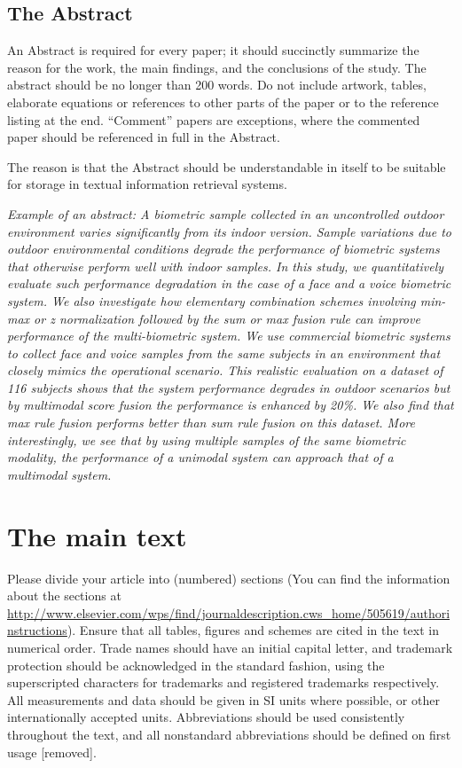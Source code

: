 \documentclass[times,twocolumn,final]{elsarticle}
\begin{document}
\subsection{The Abstract}
An Abstract is required for every paper; it should succinctly summarize
the reason for the work, the main findings, and the conclusions of the
study. The abstract should be no longer than 200 words. Do not include
artwork, tables, elaborate equations or references to other parts of
the paper or to the reference listing at the end. ``Comment'' papers
are exceptions, where the commented paper should be referenced in full
in the Abstract.

The reason is that the Abstract should be understandable in itself to
be suitable for storage in textual information retrieval systems.

\textit{Example of an abstract: A biometric sample collected in an
uncontrolled outdoor environment varies significantly from its
indoor version. Sample variations due to outdoor environmental
conditions degrade the performance of biometric systems that
otherwise perform well with indoor samples. In this study, we
quantitatively evaluate such performance degradation in the case
of a face and a voice biometric system. We also investigate how
elementary combination schemes involving min-max or z
normalization followed by the sum or max fusion rule can
improve performance of the multi-biometric system. We use
commercial biometric systems to collect face and voice samples
from the same subjects in an environment that closely mimics the
operational scenario. This realistic evaluation on a dataset of
116 subjects shows that the system performance degrades in
outdoor scenarios but by multimodal score fusion the
performance is enhanced by 20\%. We also find that max rule
fusion performs better than sum rule fusion on this dataset. More
interestingly, we see that by using multiple samples of the same
biometric modality, the performance of a unimodal system can
approach that of a multimodal system.}

\section{The main text}

Please divide your article into (numbered) sections (You can find the
information about the sections at
\url{http://www.elsevier.com/wps/find/journaldescription.cws_home/505619/authorinstructions}).
Ensure that all tables, figures and schemes are cited in the text in
numerical order. Trade names should have an initial capital letter, and
trademark protection should be acknowledged in the standard fashion,
using the superscripted characters for trademarks and registered
trademarks respectively. All measurements and data should be given in
SI units where possible, or other internationally accepted units.
Abbreviations should be used consistently throughout the text, and all
nonstandard abbreviations should be defined on first usage
[removed].
\end{document}
